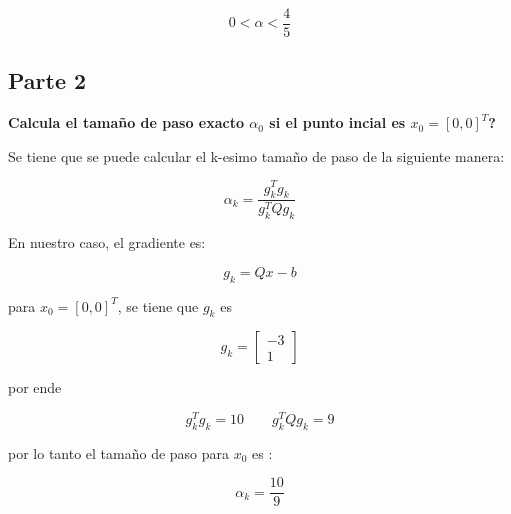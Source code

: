 \begin{equation*}
    0 < \alpha < \frac{4}{5}
\end{equation*}

\subsection*{Parte 2}

\textbf{Calcula el tamaño de paso exacto $\alpha_0$ si el punto incial es $x_0 = [0, 0]^T$?}

Se tiene que se puede calcular el k-esimo tamaño de paso de la siguiente manera:

\begin{equation*}
    \alpha_k = \frac{g_k^Tg_k}{g_k^TQg_k}
\end{equation*}

En nuestro caso, el gradiente es:

\begin{equation*}
    g_k = Qx-b
\end{equation*}

para $x_0 = [0, 0]^T$, se tiene que $g_k$ es

\begin{equation*}
    g_k = \begin{bmatrix}
        -3 \\ 1
    \end{bmatrix}
\end{equation*}

por ende

\begin{equation*}
    g_k^T g_k = 10 \qquad g_k^TQg_k = 9
\end{equation*}

por lo tanto el tamaño de paso para $x_0$ es :

\begin{equation*}
    \alpha_k = \frac{10}{9}
\end{equation*}